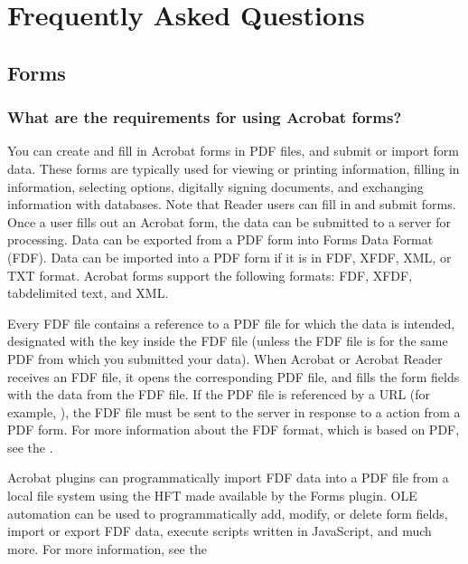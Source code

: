\documentclass[letterpaper,12pt,english,openany,oneside]{sphinxmanual}
\begin{document}
\chapter{Frequently Asked Questions}
\label{\detokenize{apxDevFAQ:frequently-asked-questions}}\label{\detokenize{apxDevFAQ::doc}}

\section{Forms}
\label{\detokenize{apxDevFAQ:forms}}

\subsection{What are the requirements for using Acrobat forms?}
\label{\detokenize{apxDevFAQ:what-are-the-requirements-for-using-acrobat-forms}}
You can create and fill in Acrobat forms in PDF files, and submit or import form data. These forms are typically used for viewing or printing information, filling in information, selecting options, digitally signing documents, and exchanging information with databases. Note that Reader users can fill in and submit forms. Once a user fills out an Acrobat form, the data can be submitted to a server for processing. Data can be exported from a PDF form into Forms Data Format (FDF). Data can be imported into a PDF form if it is in FDF, XFDF, XML, or TXT format. Acrobat forms support the following formats: FDF, XFDF, tab\sphinxhyphen{}delimited text, and XML.

Every FDF file contains a reference to a PDF file for which the data is intended, designated with the  key inside the FDF file (unless the FDF file is for the same PDF from which you submitted your data). When Acrobat or Acrobat Reader receives an FDF file, it opens the corresponding PDF file, and fills the form fields with the data from the FDF file. If the PDF file is referenced by a URL (for example, ), the FDF file must be sent to the server in response to a  action from a PDF form. For more information about the FDF format, which is based on PDF, see the  .

Acrobat plug\sphinxhyphen{}ins can programmatically import FDF data into a PDF file from a local file system using the HFT made available by the Forms plug\sphinxhyphen{}in. OLE automation can be used to programmatically add, modify, or delete form fields, import or export FDF data, execute scripts written in JavaScript, and much more. For more information, see the 
\end{document}
